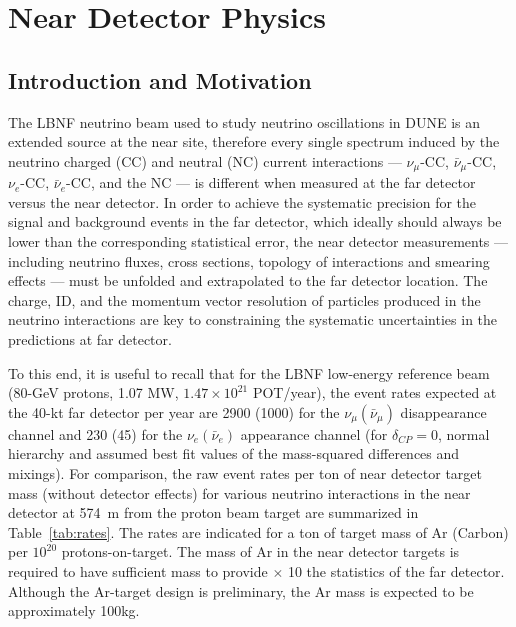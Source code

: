 
\chapter{Near Detector Physics}
\label{ch:physics-nd}

\section{Introduction and Motivation}
\label{sec:physics-nd-introduction}

The LBNF neutrino beam used to study neutrino oscillations in DUNE is
an extended source at the near site, therefore every single spectrum
induced by the neutrino charged (CC) and neutral (NC) current
interactions --- $\nu_\mu$-CC, $\bar \nu_\mu$-CC, $\nu_e$-CC, $\bar
\nu_e$-CC, and the NC --- is different when measured at the far
detector versus the near detector.  In order to achieve the systematic
precision for the signal and background events in the far detector,
which ideally should always be lower than the corresponding
statistical error, the near detector measurements --- including
neutrino fluxes, cross sections, topology of interactions and smearing
effects --- must be unfolded and extrapolated to the far detector
location.  The
charge, ID, and the momentum vector resolution of particles produced
in the neutrino interactions are %
key to constraining the systematic uncertainties in the predictions at
far detector.
%

To this end, it is useful to recall that for the LBNF low-energy reference beam
(80-GeV protons, 1.07 MW, $1.47 \times 10^{21} $ POT/year), the 
event rates expected at the 40-kt far detector per year are 
2900 (1000) for the $\nu_\mu (\bar \nu_\mu)$
disappearance channel and 230 (45) for the $\nu_e(\bar \nu_e)$
appearance channel (for $\delta_{CP}=0$, normal hierarchy and assumed best fit values of
the mass-squared differences and mixings). For comparison, the raw
event rates per ton of near detector target mass (without detector
effects) for various neutrino interactions in the near detector at
\SI{574}{\m} from the proton beam target are summarized in
Table~\ref{tab:rates}. The rates are indicated for a ton of target
mass of Ar (Carbon) per $10^{20}$ protons-on-target.  The mass of Ar
in the near detector targets is required to have sufficient mass to
provide $\times$ 10 the statistics of the far detector. Although the
Ar-target design is preliminary, the Ar mass is expected to be
approximately 100kg.

